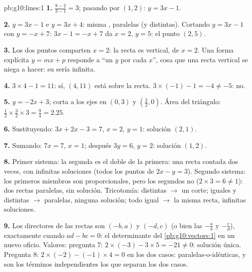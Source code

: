 \begin{solution}{pb:g10:lines:1}
\textbf{1.}  $\frac{8 - 2}{3 - 1} = 3$; pasando por $(1, 2)$:
$y = 3x - 1$.

\textbf{2.} $y = 3x - 1$ e $y = 3x + 4$: misma , paralelas (y
distintas). Cortando $y = 3x - 1$ con $y = -x + 7$: $3x - 1 = -x + 7$ da
$x = 2$, $y = 5$: el punto $(2, 5)$.

\textbf{3.} Los dos puntos comparten $x = 2$: la recta es vertical, de
 $x = 2$. Una forma explícita $y = mx + p$ responde a ``un $y$ por
cada $x$'', cosa que una recta vertical se niega a hacer: su 
sería infinita.

\textbf{4.} $3 \times 4 - 1 = 11$: sí, $(4, 11)$ está sobre la recta.
$3 \times (-1) - 1 = -4 \neq -5$: no.

\textbf{5.} $y = -2x + 3$; corta a los ejes en $(0, 3)$ y
$\left(\frac32, 0\right)$. Área del triángulo:
$\frac12 \times \frac32 \times 3 = \frac94 = 2.25$.

\textbf{6.} Sustituyendo: $3x + 2x - 3 = 7$, $x = 2$, $y = 1$: solución
$(2, 1)$.

\textbf{7.} Sumando: $7x = 7$, $x = 1$; después $3y = 6$, $y = 2$:
solución $(1, 2)$.

\textbf{8.} Primer sistema: la segunda  es el doble de la primera:
una recta contada dos veces, con infinitas soluciones (todos los puntos de
$2x - y = 3$). Segundo sistema: los primeros miembros son proporcionales,
pero los segundos no ($2 \times 3 = 6 \neq 1$): dos rectas paralelas, sin
solución. Tricotomía:  distintas $\to$ un corte; 
iguales y  distintas $\to$ paralelas, ninguna
solución; todo igual $\to$ la misma recta, infinitas soluciones.

\textbf{9.} Los  directores de las rectas son $(-b, a)$ y
$(-d, c)$ (o bien las  $-\frac ab$ y $-\frac cd$), 
exactamente cuando $ad - bc = 0$: el determinante del
\cref{pb:g10:vectors:1} en un nuevo oficio. Valores: pregunta 7:
$2 \times (-3) - 3 \times 5 = -21 \neq 0$: solución única. Pregunta 8:
$2 \times (-2) - (-1) \times 4 = 0$ en los dos casos:
paralelas-o-idénticas, y son los términos independientes los que separan
los dos casos.


\end{solution}
